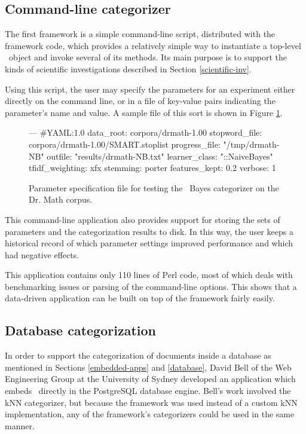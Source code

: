 \subsection{Command-line categorizer}

The first framework is a simple command-line script, distributed with
the framework code, which provides a relatively simple way to
instantiate a top-level \aicat\ object and invoke several of its
methods.  Its main purpose is to support the kinds of scientific
investigations described in Section \ref{scientific-inv}.

Using this script, the user may specify the parameters for an
experiment either directly on the command line, or in a file of
key-value pairs indicating the parameter's name and value.  A sample
file of this sort is shown in Figure \ref{parameter-file}.

\begin{figure}
\begin{code}
--- #YAML:1.0
data_root: corpora/drmath-1.00
stopword_file: corpora/drmath-1.00/SMART.stoplist
progress_file: "/tmp/drmath-NB"
outfile: "results/drmath-NB.txt"
learner_class: "::NaiveBayes"
tfidf_weighting: xfx
stemming: porter
features_kept: 0.2
verbose: 1
\end{code}
\caption{Parameter specification file for testing the \naive\ Bayes
  categorizer on the Dr. Math corpus.}
\label{parameter-file}
\end{figure}

This command-line application also provides support for storing the
sets of parameters and the categorization results to disk.  In this
way, the user keeps a historical record of which parameter settings
improved performance and which had negative effects.

This application contains only 110 lines of Perl code, most of which
deals with benchmarking issues or parsing of the command-line
options.  This shows that a data-driven application can be built on
top of the framework fairly easily.

\subsection{Database categorization}

In order to support the categorization of documents inside a database
as mentioned in Sections \ref{embedded-apps} and \ref{database}, David
Bell of the Web Engineering Group at the University of Sydney
developed an application which embeds \aicat\ directly in the
PostgreSQL database engine.  Bell's work involved the kNN categorizer,
but because the framework was used instead of a custom kNN
implementation, any of the framework's categorizers could be used in
the same manner.

